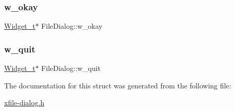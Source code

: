 \mbox{\label{structFileDialog_abcf7e51f397752ebe38216295c73ae60}} 
\subsubsection{\texorpdfstring{w\+\_\+okay}{w\_okay}}
{\footnotesize\ttfamily \hyperlink{structWidget__t}{Widget\+\_\+t}$\ast$ File\+Dialog\+::w\+\_\+okay}

\mbox{\label{structFileDialog_ae855ef41be4645e18ae4585059547502}} 
\subsubsection{\texorpdfstring{w\+\_\+quit}{w\_quit}}
{\footnotesize\ttfamily \hyperlink{structWidget__t}{Widget\+\_\+t}$\ast$ File\+Dialog\+::w\+\_\+quit}



The documentation for this struct was generated from the following file\+:\begin{DoxyCompactItemize}
\item 
\hyperlink{xfile-dialog_8h}{xfile-\/dialog.\+h}\end{DoxyCompactItemize}
